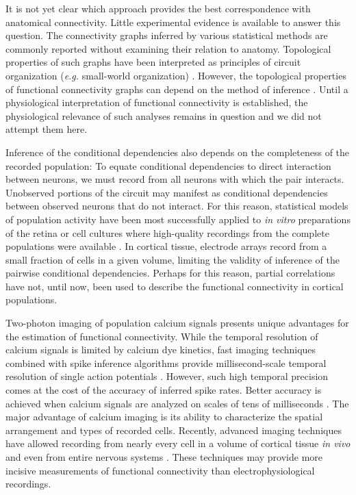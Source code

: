 \documentclass[10pt]{article}
\begin{document}
It is not yet clear which approach provides the best correspondence with anatomical connectivity. Little experimental evidence is available to answer this question.  The connectivity graphs inferred by various statistical methods are commonly reported without examining their relation to anatomy.  
Topological properties of such graphs have been interpreted as principles of circuit organization (\emph{e.g.} small-world organization) \cite{Feldt:2011, Yu:2008, Malmersjo:2013, Sadovsky:2014}.  However, the topological properties of functional connectivity graphs can depend on the method of inference \cite{Zalesky:2012}. Until a physiological interpretation of functional connectivity is established, the physiological relevance of such analyses remains in question and we did not attempt them here.

Inference of the conditional dependencies also depends on the completeness of the recorded population:  To equate conditional dependencies to direct interaction between neurons, we must record from all neurons with which the pair interacts. Unobserved portions of the circuit may manifest as conditional dependencies between observed neurons that do not interact. For this reason, statistical models of population activity have been most successfully applied to \emph{in vitro} preparations of the retina or cell cultures where high-quality recordings from the complete populations were available \cite{Pillow:2008}. In cortical tissue, electrode arrays record from a small fraction of cells in a given volume, limiting the validity of inference of the pairwise conditional dependencies. Perhaps for this reason, partial correlations have not, until now, been used to describe the functional connectivity in cortical populations.

Two-photon imaging of population calcium signals presents unique advantages for the estimation of functional connectivity.  While the temporal resolution of calcium signals is limited by calcium dye kinetics, fast imaging techniques combined with spike inference algorithms provide millisecond-scale temporal resolution of single action potentials \cite{Grewe:2010}. However, such high temporal precision comes at the cost of the accuracy of inferred spike rates.  Better accuracy is achieved when calcium signals are analyzed on scales of tens of milliseconds \cite{Cotton:2013}.  The major advantage of calcium imaging is its ability to characterize the spatial arrangement and types of recorded cells.  Recently, advanced imaging techniques have allowed recording from nearly every cell in a volume of cortical tissue  \emph{in vivo} \cite{Katona:2012, Cotton:2013} and even from entire nervous systems \cite{Leung:2013, Ahrens:2013}.  These techniques may provide more incisive measurements of functional connectivity than electrophysiological recordings.  
\end{document}
